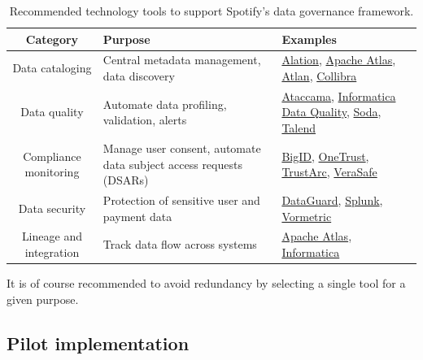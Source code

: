 \documentclass[11pt,a4paper,computermodern]{article}
\begin{document}
\begin{table}[ht]
	\centering
	\begin{threeparttable}
		\caption{Recommended technology tools to support Spotify's data governance framework.}
		\label{table:tools}
		\begin{tabularx}{0.99\textwidth}{c >{\centering\arraybackslash}X >{\centering\arraybackslash}X}
			\toprule
			Category & Purpose & Examples \\
			\midrule
			Data cataloging & Central metadata management, data discovery & \href{https://www.alation.com/}{Alation}, \href{https://atlas.apache.org/}{Apache Atlas}, \href{https://atlan.com/}{Atlan}, \href{https://www.collibra.com/}{Collibra} \\
			Data quality & Automate data profiling, validation, alerts & \href{https://www.ataccama.com/}{Ataccama}, \href{https://www.informatica.com/products/data-quality.html}{Informatica Data Quality}, \href{https://www.soda.io/}{Soda}, \href{https://www.talend.com/products/data-integrity-governance/}{Talend} \\
			Compliance monitoring & Manage user consent, automate data subject access requests (DSARs) & \href{https://bigid.com/}{BigID}, \href{https://www.onetrust.com/}{OneTrust}, \href{https://trustarc.com/}{TrustArc}, \href{https://verasafe.com/}{VeraSafe} \\
			Data security & Protection of sensitive user and payment data & \href{https://www.dataguard.com/}{DataGuard}, \href{https://www.splunk.com/}{Splunk}, \href{https://cpl.thalesgroup.com/encryption/vormetric-data-security-platform}{Vormetric} \\
			Lineage and integration & Track data flow across systems & \href{https://atlas.apache.org/}{Apache Atlas}, \href{https://www.informatica.com/products/data-quality.html}{Informatica} \\
			\bottomrule
		\end{tabularx}
	\end{threeparttable}
\end{table}

It is of course recommended to avoid redundancy by selecting a single tool for a given purpose.


\subsection*{Pilot implementation}
\end{document}
